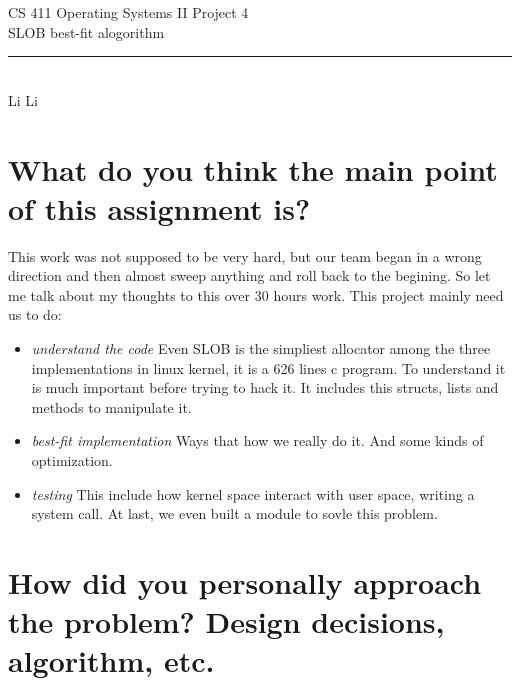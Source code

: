 \documentclass[12pt,letterpaper]{article}
\begin{document}
\begin{titlepage}
    \vspace*{4cm}
    \begin{flushleft}
    {\huge
        CS 411 Operating Systems II Project 4\\[.5cm]
    }
    {\large
         SLOB best-fit alogorithm
    }
    \end{flushleft}
    \vfill
    \rule{5in}{.5mm}\\
    Li Li

\end{titlepage}
\section{What do you think the main point of this assignment is?}
\indent This work was not supposed to be very hard, but our team began in a wrong direction and then almost sweep anything and roll back to the begining. So let me talk about my thoughts to this over 30 hours work. This project mainly need us to do:
\begin{itemize}
\item \emph{understand the code}  Even SLOB is the simpliest allocator among the three implementations in linux kernel, it is a 626 lines c program. To understand it is much important before trying to hack it. It includes this structs, lists and methods to manipulate it.
\item \emph{best-fit implementation} Ways that how we really do it. And some kinds of optimization.
\item \emph{testing} This include how kernel space interact with user space, writing a system call. At last, we even built a module to sovle this problem.
\end{itemize}


\section{How did you personally approach the problem? Design decisions, algorithm, etc.}
\end{document}
